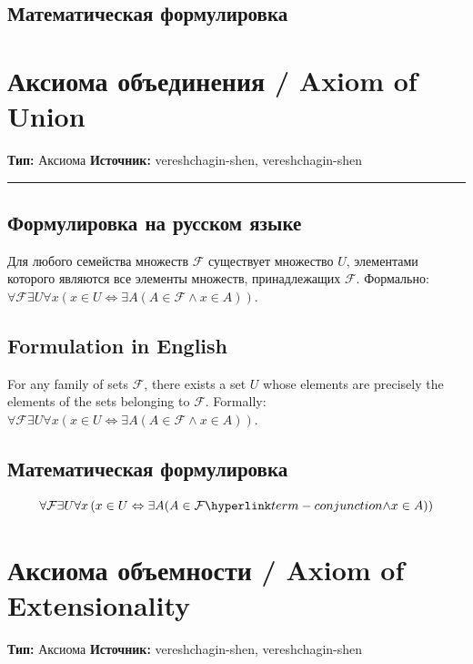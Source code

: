 \documentclass[12pt,a4paper]{report}
\begin{document}
\section*{Математическая формулировка}
\hypertarget{obj-set}{}
\hypertarget{obj-set}{}
\begin{object} %

\chapter{Аксиома объединения / Axiom of Union}\label{entity:axm-zfc-union}
\textbf{Тип:} Аксиома \hfill \textbf{Источник:} vereshchagin-shen, vereshchagin-shen

\vspace{0.5em}
\hrule
\vspace{1em}

\section*{Формулировка на русском языке}
Для любого семейства множеств $\mathcal{F}$ существует множество $U$, элементами которого являются все элементы множеств, принадлежащих $\mathcal{F}$. Формально: $\forall \mathcal{F} \exists U \forall x (x \in U \iff \exists A (A \in \mathcal{F} \land x \in A))$.

\section*{Formulation in English}
For any family of sets $\mathcal{F}$, there exists a set $U$ whose elements are precisely the elements of the sets belonging to $\mathcal{F}$. Formally: $\forall \mathcal{F} \exists U \forall x (x \in U \iff \exists A (A \in \mathcal{F} \land x \in A))$.

\section*{Математическая формулировка}
\hypertarget{axm-zfc-union}{}
\hypertarget{axm-zfc-union}{}
\begin{axiom} %



\[
\mForall{\mathcal{F}}
\mExists{U} \mForall{x} \left( x \in U \mIff \mExists{A} (A \in \mathcal{F} \entityref{term-conjunction}{\land} x \in A) \right)
\]
\end{axiom}

\chapter{Аксиома объемности / Axiom of Extensionality}\label{entity:axm-zfc-extensionality}
\textbf{Тип:} Аксиома \hfill \textbf{Источник:} vereshchagin-shen, vereshchagin-shen


\end{object}
\end{document}
